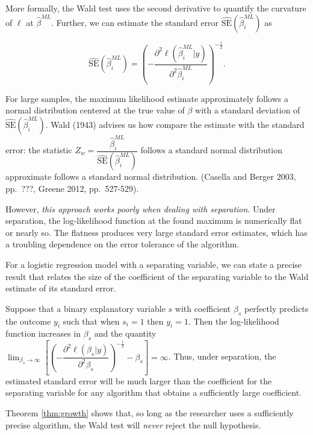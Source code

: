 \documentclass[
]{article}
\begin{document}
More formally, the Wald test uses the second derivative to quantify the
curvature of \(\ell\) at \(\hat{\beta}^{ML}\). Further, we can estimate
the standard error \(\widehat{\text{SE}}(\hat{\beta}_i^{ML})\) as

\begin{equation}\label{eqn:ml-se}
\widehat{\text{SE}} \left( \hat{\beta}_i^{ML} \right) = \left( - \dfrac{\partial^2 \ell(\hat{\beta}_i^{ML} | y)}{\partial^2 \hat{\beta}_i^{ML}} \right)^{-\frac{1}{2}}\text{.}
\end{equation}

For large samples, the maximum likelihood estimate approximately follows
a normal distribution centered at the true value of \(\beta\) with a
standard deviation of \(\widehat{\text{SE}}(\hat{\beta}_i^{ML})\). Wald
(1943) advises us how compare the estimate with the standard error: the
statistic
\(Z_w = \dfrac{\hat{\beta}_i^{ML}}{\widehat{\text{SE}}(\hat{\beta}_i^{ML})}\)
follows a standard normal distribution approximate follows a standard
normal distribution. (Casella and Berger 2003, pp.~???, Greene 2012,
pp.~527-529).

However, \emph{this approach works poorly when dealing with separation}.
Under separation, the log-likelihood function at the found maximum is
numerically flat or nearly so. The flatness produces very large standard
error estimates, which has a troubling dependence on the error tolerance
of the algorithm.

For a logistic regression model with a separating variable, we can state
a precise result that relates the size of the coefficient of the
separating variable to the Wald estimate of its standard error.

\begin{theorem}\label{thm:growth}
Suppose that a binary explanatory variable $s$ with coefficient $\beta_s$ perfectly predicts the outcome $y_i$ such that when $s_i = 1$ then $y_i = 1$. Then the log-likelihood function increases in $\beta_s$ and the quantity $\lim_{\beta_s \to \infty} \left[ \left( - \dfrac{\partial^2 \ell(\beta_s | y)}{\partial^2 \beta_s} \right)^{-\frac{1}{2}} - \beta_s \right] = \infty$. Thus, under separation, the estimated standard error will be much larger than the coefficient for the separating variable for any algorithm that obtains a sufficiently large coefficient.
\end{theorem}

\noindent Theorem \ref{thm:growth} shows that, so long as the researcher
uses a sufficiently precise algorithm, the Wald test will \emph{never}
reject the null hypothesis.
\end{document}
